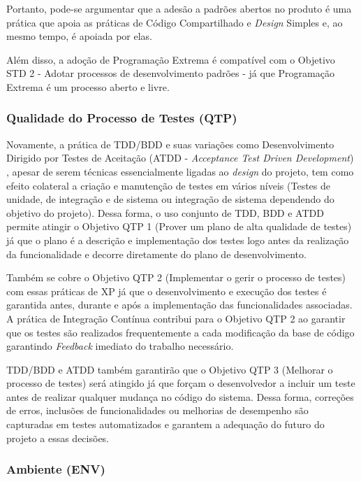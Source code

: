 Portanto, pode-se argumentar que a adesão a padrões abertos no produto
é uma prática que apoia as práticas de Código Compartilhado e
\textit{Design} Simples e, ao mesmo tempo, é apoiada por elas.

Além disso, a adoção de Programação Extrema é compatível com o
Objetivo STD 2 - Adotar processos de desenvolvimento padrões - já que
Programação Extrema é um processo aberto e livre.

\subsubsection{Qualidade do Processo de Testes (QTP)}
\label{sec:+qtp}

Novamente, a prática de TDD/BDD e suas variações como Desenvolvimento
Dirigido por Testes de Aceitação (ATDD - \textit{Acceptance Test
  Driven Development}) \cite{Owen2004}, apesar de serem técnicas
essencialmente ligadas ao \textit{design} do projeto, tem como efeito
colateral a criação e manutenção de testes em vários níveis (Testes de
unidade, de integração e de sistema ou integração de sistema
dependendo do objetivo do projeto). Dessa forma, o uso conjunto de
TDD, BDD e ATDD permite atingir o Objetivo QTP 1 (Prover um plano de
alta qualidade de testes) já que o plano é a descrição e implementação
dos testes logo antes da realização da funcionalidade e decorre
diretamente do plano de desenvolvimento.

Também se cobre o Objetivo QTP 2 (Implementar o gerir o processo de
testes) com essas práticas de XP já que o desenvolvimento e execução
dos testes é garantida antes, durante e após a implementação das
funcionalidades associadas. A prática de Integração Contínua contribui
para o Objetivo QTP 2 ao garantir que os testes são realizados
frequentemente a cada modificação da base de código garantindo
\textit{Feedback} imediato do trabalho necessário.

TDD/BDD e ATDD também garantirão que o Objetivo QTP 3 (Melhorar o
processo de testes) será atingido já que forçam o desenvolvedor a
incluir um teste antes de realizar qualquer mudança no código do
sistema. Dessa forma, correções de erros, inclusões de funcionalidades
ou melhorias de desempenho são capturadas em testes automatizados e
garantem a adequação do futuro do projeto a essas decisões.

\subsubsection{Ambiente (ENV)}
\label{sec:+env}

